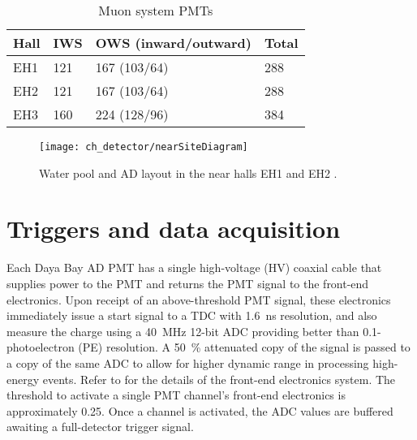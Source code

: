 \begin{table}[ht]
    \centering
    \begin{tabular}[t]{llll}
        \toprule
        Hall & IWS & OWS (inward/outward) & Total\\
        \midrule
        EH1 & 121 & 167 (103/64) & 288\\
        EH2 & 121 & 167 (103/64) & 288\\
        EH3 & 160 & 224 (128/96) & 384\\
        \bottomrule
    \end{tabular}
    \caption[Muon system PMTs]{Muon system PMTs \cite{muonsystem2015}}
    \label{tab:wp_pmts}
\end{table}

\begin{figure}
    \centering
    \texttt{[image: ch\_detector/nearSiteDiagram]}
    \caption[Water pool and AD layout]{
        Water pool and AD layout in the near halls EH1 and EH2
        \cite{sidebyside}.
    }
    \label{fig:wpcutout}
\end{figure}



\section{Triggers and data acquisition}
\label{sec:daq}

Each Daya Bay AD PMT has a single high-voltage (HV) coaxial cable
that supplies power to the PMT and returns the PMT signal to the
front-end electronics.
Upon receipt of an above-threshold PMT signal, these electronics immediately
issue a start signal to a TDC with \SI{1.6}{\ns} resolution,
and also measure the charge using a \SI{40}{\MHz} \num{12}-bit ADC
providing better than \num{0.1}-photoelectron (PE) resolution.
A \SI{50}{\percent} attenuated copy of the signal is passed to a copy
of the same ADC to allow for higher dynamic range in processing high-energy
events.
Refer to \cite{sidebyside,ngd2016} for the details
of the front-end electronics system.
The threshold to activate a single PMT channel's front-end electronics
is approximately \SI{0.25}{\pe}.
Once a channel is activated, the ADC values are buffered
awaiting a full-detector trigger signal.

